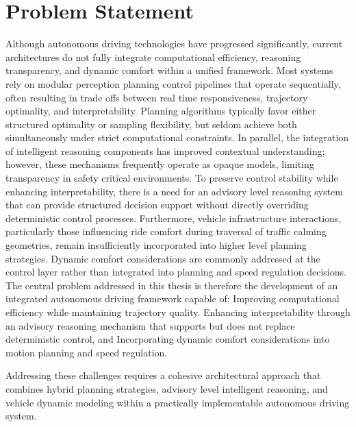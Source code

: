 \documentclass[a4paper,12pt,one side]{report}
\theoremstyle{definition}
\begin{document}
\section{Problem Statement}
Although autonomous driving technologies have progressed significantly, current architectures do not fully integrate computational efficiency, reasoning transparency, and dynamic comfort within a unified framework. Most systems rely on modular perception planning control pipelines that operate sequentially, often resulting in trade offs between real time responsiveness, trajectory optimality, and interpretability.
Planning algorithms typically favor either structured optimality or sampling flexibility, but seldom achieve both simultaneously under strict computational constraints. In parallel, the integration of intelligent reasoning components has improved contextual understanding; however, these mechanisms frequently operate as opaque models, limiting transparency in safety critical environments. To preserve control stability while enhancing interpretability, there is a need for an advisory level reasoning system that can provide structured decision support without directly overriding deterministic control processes.
Furthermore, vehicle infrastructure interactions, particularly those influencing ride comfort during traversal of traffic calming geometries, remain insufficiently incorporated into higher level planning strategies. Dynamic comfort considerations are commonly addressed at the control layer rather than integrated into planning and speed regulation decisions.
The central problem addressed in this thesis is therefore the development of an integrated autonomous driving framework capable of: Improving computational efficiency while maintaining trajectory quality. Enhancing interpretability through an advisory reasoning mechanism that supports but does not replace deterministic control, and Incorporating dynamic comfort considerations into motion planning and speed regulation.

Addressing these challenges requires a cohesive architectural approach that combines hybrid planning strategies, advisory level intelligent reasoning, and vehicle dynamic modeling within a practically implementable autonomous driving system.
\end{document}
